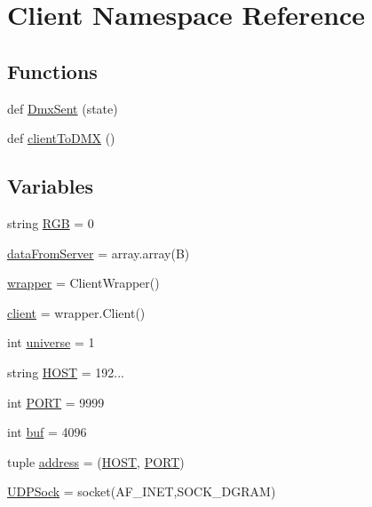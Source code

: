 \hypertarget{namespaceClient}{}\section{Client Namespace Reference}
\label{namespaceClient}
\subsection*{Functions}
\begin{DoxyCompactItemize}
\item 
def \hyperlink{namespaceClient_ab41a4c32fbde2bd0f2824fe0e622c459}{Dmx\+Sent} (state)
\item 
def \hyperlink{namespaceClient_ad2dac70b186603f10dd58c32e44fad02}{client\+To\+D\+MX} ()
\end{DoxyCompactItemize}
\subsection*{Variables}
\begin{DoxyCompactItemize}
\item 
string \hyperlink{namespaceClient_a83092b31577e2af791ab682875cbe7c9}{R\+GB} = \textquotesingle{}0\textquotesingle{}
\item 
\hyperlink{namespaceClient_a493f1ab24ec4718fe12d03ef3023df03}{data\+From\+Server} = array.\+array(\textquotesingle{}B\textquotesingle{})
\item 
\hyperlink{namespaceClient_a4434f1a86cf88cad290038ad5225aa8a}{wrapper} = Client\+Wrapper()
\item 
\hyperlink{namespaceClient_a084b845ba369e66e2fccb165382b5544}{client} = wrapper.\+Client()
\item 
int \hyperlink{namespaceClient_ac4cedbaff7abc4792f7c896b6198e527}{universe} = 1
\item 
string \hyperlink{namespaceClient_ae05d46d0136906f567ba2e59aa7d720f}{H\+O\+ST} = \textquotesingle{}192...\textquotesingle{}
\item 
int \hyperlink{namespaceClient_a378fa5b136bb2e7aaeb3c36410a5bbbf}{P\+O\+RT} = 9999
\item 
int \hyperlink{namespaceClient_a28e4d5823de1c828e9cfc742595a4ec4}{buf} = 4096
\item 
tuple \hyperlink{namespaceClient_ae76026553ec6c4b09ef079364564febf}{address} = (\hyperlink{namespaceClient_ae05d46d0136906f567ba2e59aa7d720f}{H\+O\+ST}, \hyperlink{namespaceClient_a378fa5b136bb2e7aaeb3c36410a5bbbf}{P\+O\+RT})
\item 
\hyperlink{namespaceClient_a34f31635b731e58b9d00def9e7bc358f}{U\+D\+P\+Sock} = socket(A\+F\+\_\+\+I\+N\+ET,S\+O\+C\+K\+\_\+\+D\+G\+R\+AM)
\end{DoxyCompactItemize}


